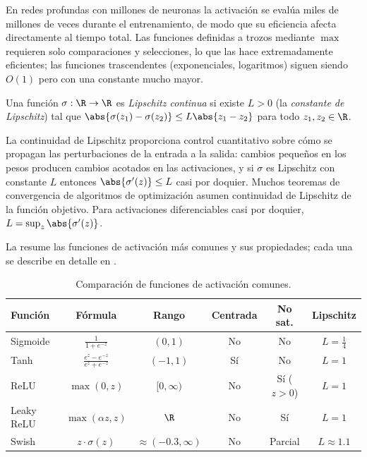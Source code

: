 En redes profundas con millones de neuronas la activaci\'on se eval\'ua miles de
millones de veces durante el entrenamiento, de modo que su eficiencia afecta
directamente al tiempo total. Las funciones definidas a trozos mediante $\max$
requieren solo comparaciones y selecciones, lo que las hace extremadamente
eficientes; las funciones trascendentes (exponenciales, logaritmos) siguen siendo
$O(1)$ pero con una constante mucho mayor.

\begin{definition}
\label{def:found:lipschitz}
Una funci\'on $\sigma : \R \to \R$ es \emph{Lipschitz continua} si existe $L > 0$
(la \emph{constante de Lipschitz}) tal que
$\abs{\sigma(z_1) - \sigma(z_2)} \le L\abs{z_1 - z_2}$ para todo $z_1, z_2 \in \R$.
\end{definition}

La continuidad de Lipschitz proporciona control cuantitativo sobre c\'omo se
propagan las perturbaciones de la entrada a la salida: cambios peque\~nos en los
pesos producen cambios acotados en las activaciones, y si $\sigma$ es Lipschitz con
constante $L$ entonces $\abs{\sigma'(z)} \le L$ casi por doquier. Muchos teoremas de
convergencia de algoritmos de optimizaci\'on asumen continuidad de Lipschitz de la
funci\'on objetivo. Para activaciones diferenciables casi por doquier,
$L = \sup_z \abs{\sigma'(z)}$.

La  resume las funciones de activaci\'on m\'as comunes y
sus propiedades; cada una se describe en detalle en
.

\begin{table}[h]
\centering
\caption{Comparaci\'on de funciones de activaci\'on comunes.}
\label{tab:found:activations}
\begin{tabular}{@{}lccccc@{}}
\toprule
\textbf{Funci\'on} & \textbf{F\'ormula} & \textbf{Rango} & \textbf{Centrada} & \textbf{No sat.} & \textbf{Lipschitz} \\
\midrule
Sigmoide & $\frac{1}{1+e^{-z}}$ & $(0,1)$ & No & No & $L=\frac{1}{4}$ \\
\addlinespace
Tanh & $\frac{e^z-e^{-z}}{e^z+e^{-z}}$ & $(-1,1)$ & S\'i & No & $L=1$ \\
\addlinespace
ReLU & $\max(0,z)$ & $[0,\infty)$ & No & S\'i ($z>0$) & $L=1$ \\
\addlinespace
Leaky ReLU & $\max(\alpha z,z)$ & $\R$ & No & S\'i & $L=1$ \\
\addlinespace
Swish & $z \cdot \sigma(z)$ & $\approx(-0.3,\infty)$ & No & Parcial & $L\approx 1.1$ \\
\bottomrule
\end{tabular}
\end{table}

